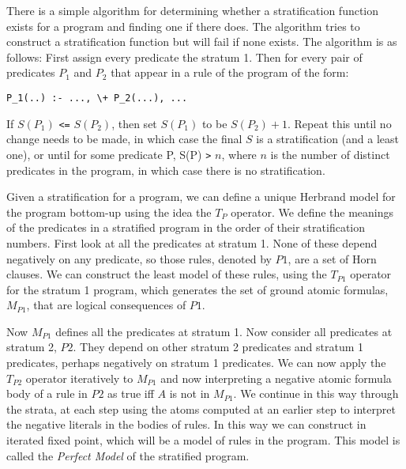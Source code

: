 There is a simple algorithm for determining whether a stratification
function exists for a program and finding one if there does.
The algorithm tries to construct a stratification function but will
fail if none exists.  The algorithm is as follows: First assign every
predicate the stratum 1.  Then for every pair of predicates $P_1$ and
$P_2$ that appear in a rule of the program of the form:
\begin{verbatim}
P_1(..) :- ..., \+ P_2(...), ...
\end{verbatim}
If $S(P_1)$ \verb|<=| $S(P_2)$, then set $S(P_1)$ to be $S(P_2)+1$.
Repeat this until no change needs to be made, in which case the final
$S$ is a stratification (and a least one), or until for some predicate
P, S(P) \verb|>| $n$, where $n$ is the number of distinct predicates
in the program, in which case there is no stratification.

Given a stratification for a program, we can define a unique Herbrand
model for the program bottom-up using the idea the $T_P$ operator.  We
define the meanings of the predicates in a stratified program in the
order of their stratification numbers.  First look at all the
predicates at stratum 1.  None of these depend negatively on any
predicate, so those rules, denoted by ${P1}$, are a set of Horn
clauses.  We can construct the least model of these rules, using the
$T_{P1}$ operator for the stratum 1 program, which generates the set of
ground atomic formulas, $M_{P1}$, that are logical consequences of
${P1}$.

Now $M_{P1}$ defines all the predicates at stratum 1.  Now consider all
predicates at stratum 2, ${P2}$.  They depend on other stratum 2
predicates and stratum 1 predicates, perhaps negatively on stratum 1
predicates.  We can now apply the $T_{P2}$ operator iteratively to
$M_{P1}$ and now interpreting a negative atomic formula %
body of a rule in ${P2}$ as true iff $A$ is not in $M_{P1}$.  We
continue in this way through the strata, at each step using the atoms
computed at an earlier step to interpret the negative literals in the
bodies of rules.  In this way we can construct in iterated fixed
point, which will be a model of rules in the program.  This model is
called the {\em Perfect Model} of the stratified program.


